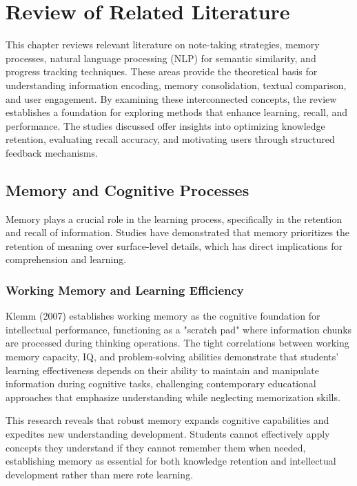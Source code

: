 \chapter{Review of Related Literature}
\label{chap:literature}

This chapter reviews relevant literature on note-taking strategies, memory processes, natural language processing (NLP) for semantic similarity, and progress tracking techniques. These areas provide the theoretical basis for understanding information encoding, memory consolidation, textual comparison, and user engagement. By examining these interconnected concepts, the review establishes a foundation for exploring methods that enhance learning, recall, and performance. The studies discussed offer insights into optimizing knowledge retention, evaluating recall accuracy, and motivating users through structured feedback mechanisms.

\section{Memory and Cognitive Processes}

Memory plays a crucial role in the learning process, specifically in the retention and recall of information. Studies have demonstrated that memory prioritizes the retention of meaning over surface-level details, which has direct implications for comprehension and learning.

{\color{maroon}
\subsection{Working Memory and Learning Efficiency}

Klemm (2007) establishes working memory as the cognitive foundation for intellectual performance, functioning as a "scratch pad" where information chunks are processed during thinking operations. The tight correlations between working memory capacity, IQ, and problem-solving abilities demonstrate that students' learning effectiveness depends on their ability to maintain and manipulate information during cognitive tasks, challenging contemporary educational approaches that emphasize understanding while neglecting memorization skills.

This research reveals that robust memory expands cognitive capabilities and expedites new understanding development. Students cannot effectively apply concepts they understand if they cannot remember them when needed, establishing memory as essential for both knowledge retention and intellectual development rather than mere rote learning.
}

